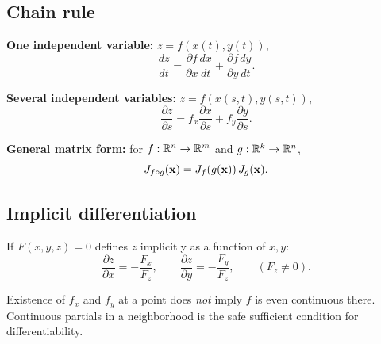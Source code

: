 \subsection{Chain rule}
\textbf{One independent variable:} $z = f(x(t), y(t))$,
\[ \frac{dz}{dt} = \frac{\partial f}{\partial x}\frac{dx}{dt} + \frac{\partial f}{\partial y}\frac{dy}{dt}. \]

\textbf{Several independent variables:} $z = f(x(s,t), y(s,t))$,
\[ \frac{\partial z}{\partial s} = f_x \frac{\partial x}{\partial s} + f_y \frac{\partial y}{\partial s}. \]

\textbf{General matrix form:} for $f: \mathbb{R}^n \to \mathbb{R}^m$ and $g: \mathbb{R}^k \to \mathbb{R}^n$,
\[ J_{f \circ g}(\mathbf{x}) = J_f(g(\mathbf{x})) \, J_g(\mathbf{x}). \]

\subsection{Implicit differentiation}
If $F(x, y, z) = 0$ defines $z$ implicitly as a function of $x, y$:
\[ \frac{\partial z}{\partial x} = -\frac{F_x}{F_z}, \qquad \frac{\partial z}{\partial y} = -\frac{F_y}{F_z}, \qquad (F_z \neq 0). \]

\begin{pitfallbox}
Existence of $f_x$ and $f_y$ at a point does \emph{not} imply $f$ is even continuous there.
Continuous partials in a neighborhood is the safe sufficient condition for differentiability.
\end{pitfallbox}
